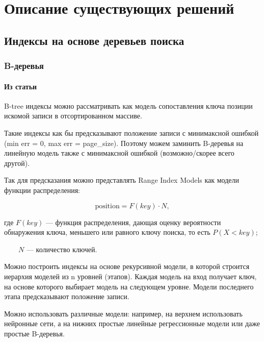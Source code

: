 \chapter{Описание существующих решений}

\section{Индексы на основе деревьев поиска}

\subsection{B-деревья}

\subsubsection{Из статьи}

B-tree индексы можно рассматривать как модель сопоставления ключа позиции
искомой записи в отсортированном массиве.

Такие индексы как бы предсказывают положение записи с минимаксной ошибкой (min
err = 0, max err = page\_size). Поэтому можем заминить B-деревья на линейную
модель также с минимаксной ошибкой (возможно/скорее всего другой).


Так для предсказания можно представлять Range Index Models как модели функции
распределения:

\begin{equation}
    \text{position} = F(key) \cdot N,
\end{equation}

где $F(key)$ --- функция распределения, дающая оценку вероятности обнаружения
ключа, меньшего или равного ключу поиска, то есть $P(X < key)$;

~~~~$N$ --- количество ключей.


Можно построить индексы на основе рекурсивной модели, в которой строится
иерархия моделей из n уровней (этапов). Каждая модель на вход получает ключ, на
основе которого выбирает модель на следующем уровне. Модели последнего этапа
предсказывают положение записи.


Можно использовать различные модели: например, на верхнем использовать нейронные
сети, а на нижних простые линейные регрессионные модели или даже простые
B-деревья.

